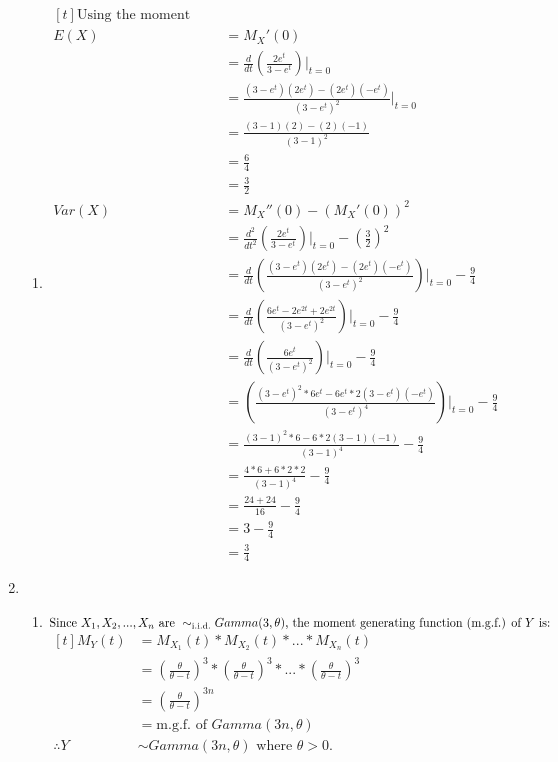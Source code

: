 \documentclass{article}
\begin{document}
\begin{enumerate}
\begin{enumerate}[label=(\roman*)]
    \item $\begin{aligned}[t]
    \text{Using the moment generating function, } \\
    E(X) &= M_X'(0) \\
    &= \frac{d}{dt}(\frac{2e^t}{3-e^t})|_{t=0} \\
    &= \frac{(3-e^t)(2e^t)-(2e^t)(-e^t)}{(3-e^t)^2}|_{t=0} \\
    &= \frac{(3-1)(2)-(2)(-1)}{(3-1)^2} \\
    &= \frac{6}{4} \\
    &= \frac{3}{2} \\
    Var(X) &= M_X''(0) - (M_X'(0))^2 \\
    &= \frac{d^2}{dt^2}(\frac{2e^t}{3-e^t})|_{t=0} - (\frac{3}{2})^2 \\
    &= \frac{d}{dt}(\frac{(3-e^t)(2e^t)-(2e^t)(-e^t)}{(3-e^t)^2})|_{t=0} - \frac{9}{4} \\
    &= \frac{d}{dt}(\frac{6e^t-2e^{2t}+2e^{2t}}{(3-e^t)^2})|_{t=0} - \frac{9}{4} \\
    &= \frac{d}{dt}(\frac{6e^t}{(3-e^t)^2})|_{t=0} - \frac{9}{4} \\
    &= (\frac{(3-e^t)^2*6e^t-6e^t*2(3-e^t)(-e^t)}{(3-e^t)^4})|_{t=0} - \frac{9}{4} \\
    &= \frac{(3-1)^2*6-6*2(3-1)(-1)}{(3-1)^4} - \frac{9}{4} \\
    &= \frac{4*6+6*2*2}{(3-1)^4} - \frac{9}{4} \\
    &= \frac{24+24}{16} - \frac{9}{4} \\
    &= 3 - \frac{9}{4} \\
    &= \frac{3}{4}
    \end{aligned}$
    \end{enumerate}

\item
    \begin{enumerate}[label=(\roman*)]
    \item 
    $\text{Since } X_1, X_2, ..., X_n \text{ are } \sim_{\text{i.i.d.}}Gamma(3,\theta) \text{, the moment generating function (m.g.f.) of } Y \text{ is:} \\$
    $\begin{aligned}[t]
    M_Y(t) &= M_{X_1}(t) * M_{X_2}(t) * ... * M_{X_n}(t) \\
    &= (\frac{\theta}{\theta-t})^3 * (\frac{\theta}{\theta-t})^3 * ... * (\frac{\theta}{\theta-t})^3 \\
    &= (\frac{\theta}{\theta-t})^{3n} \\
    &= \text{m.g.f. of } Gamma(3n, \theta) \\
    \therefore Y &\sim Gamma(3n, \theta) \text{ where } \theta > 0.
    \end{aligned}$


\end{enumerate}
\end{enumerate}
\end{document}
